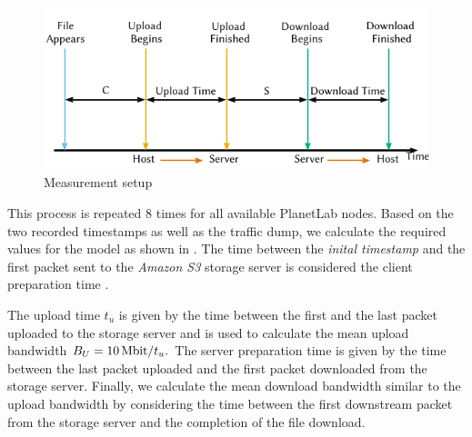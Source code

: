 \begin{figure}
  \includegraphics{application/cloud_file_synchronization/application_measurements/figures/measurement_setup}
  \caption{Measurement setup}
  \label{fig:application:cloud_file_synchronisation:application_measurements:bandwidth_preparation_times:measurement_setup}
\end{figure}

This process is repeated \(8\) times for all available PlanetLab nodes.
Based on the two recorded timestamps as well as the traffic dump, we calculate the required values for the model as shown in .
The time between the \emph{inital timestamp} and the first packet sent to the \emph{Amazon S3} storage server is considered the client preparation time \clientpreparationtime.


The upload time \(t_u\) is given by the time between the first and the last packet uploaded to the storage server and is used to calculate the mean upload bandwidth \(\uploadbandwidth = \SI{10}{\mega\bit} / t_u.\)
The server preparation time \serverpreparationtime is given by the time between the last packet uploaded and the first packet downloaded from the storage server.
Finally, we calculate the mean download bandwidth \downloadbandwidth similar to the upload bandwidth by considering the time between the first downstream packet from the storage server and the completion of the file download.

